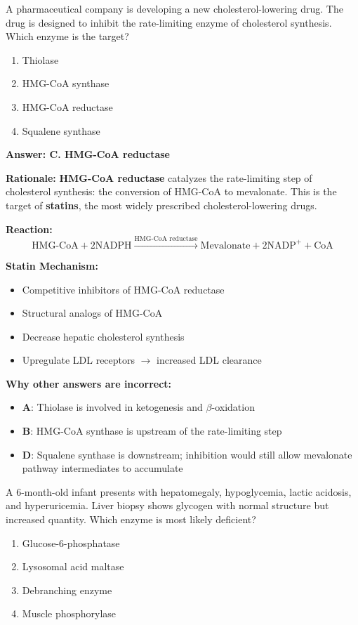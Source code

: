 \begin{exercise}
A pharmaceutical company is developing a new cholesterol-lowering drug. The drug is designed to inhibit the rate-limiting enzyme of cholesterol synthesis. Which enzyme is the target?
\begin{enumerate}[label=\Alph*.]
    \item Thiolase
    \item HMG-CoA synthase
    \item HMG-CoA reductase
    \item Squalene synthase
\end{enumerate}
\end{exercise}

\begin{solution}
\textbf{Answer: C. HMG-CoA reductase}

\textbf{Rationale:} \textbf{HMG-CoA reductase} catalyzes the rate-limiting step of cholesterol synthesis: the conversion of HMG-CoA to mevalonate. This is the target of \textbf{statins}, the most widely prescribed cholesterol-lowering drugs.

\textbf{Reaction:}
\[
\text{HMG-CoA} + 2\text{NADPH} \xrightarrow{\text{HMG-CoA reductase}} \text{Mevalonate} + 2\text{NADP}^+ + \text{CoA}
\]

\textbf{Statin Mechanism:}
\begin{itemize}
    \item Competitive inhibitors of HMG-CoA reductase
    \item Structural analogs of HMG-CoA
    \item Decrease hepatic cholesterol synthesis
    \item Upregulate LDL receptors $\rightarrow$ increased LDL clearance
\end{itemize}

\textbf{Why other answers are incorrect:}
\begin{itemize}
    \item \textbf{A}: Thiolase is involved in ketogenesis and $\beta$-oxidation
    \item \textbf{B}: HMG-CoA synthase is upstream of the rate-limiting step
    \item \textbf{D}: Squalene synthase is downstream; inhibition would still allow mevalonate pathway intermediates to accumulate
\end{itemize}
\end{solution}

\begin{exercise}
A 6-month-old infant presents with hepatomegaly, hypoglycemia, lactic acidosis, and hyperuricemia. Liver biopsy shows glycogen with normal structure but increased quantity. Which enzyme is most likely deficient?
\begin{enumerate}[label=\Alph*.]
    \item Glucose-6-phosphatase
    \item Lysosomal acid maltase
    \item Debranching enzyme
    \item Muscle phosphorylase
\end{enumerate}
\end{exercise}

